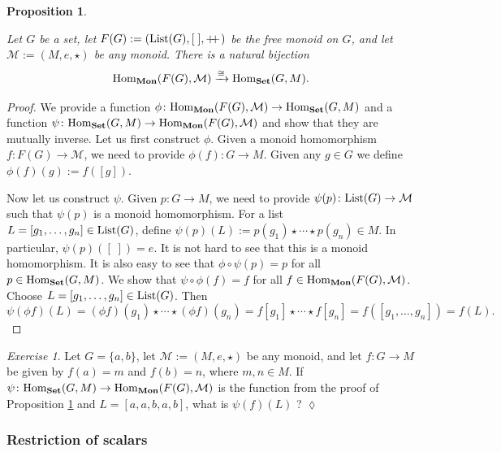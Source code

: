 \documentclass{book}
\def\tn{\textnormal}
\def\mc{\mathcal}
\def\Hom{\tn{Hom}}
\def\List{\tn{List}}
\def\to{\rightarrow}
\def\taking{\colon}
\def\iso{\cong}
\def\plpl{+\!\!+\hspace{1pt}}
\newcommand{\To}[1]{\xrightarrow{#1}}
\def\Mon{{\bf Mon}}
\def\Set{{\bf Set}}
\def\mcM{\mc{M}}
\newtheorem{proposition}[subsubsection]{Proposition}
\theoremstyle{remark}
\newtheorem{exc}[subsubsection]{Exercise}
\newenvironment{exercise}{\begin{exc}}{\hspace*{\fill}$\lozenge$\end{exc}}
\theoremstyle{definition}
\begin{document}
\begin{proposition}\label{prop:free monoid}

Let $G$ be a set, let $F(G):=(\List(G),[\;],\plpl)$ be the free monoid on $G$, and let $\mcM:=(M,e,\star)$ be any monoid. There is a natural bijection
$$\Hom_\Mon(F(G),\mcM)\To{\iso}\Hom_\Set(G,M).$$

\end{proposition}

\begin{proof}

We provide a function $\phi\taking\Hom_\Mon(F(G),\mcM)\to\Hom_\Set(G,M)$ and a function $\psi\taking\Hom_\Set(G,M)\to\Hom_\Mon(F(G),\mcM)$ and show that they are mutually inverse. Let us first construct $\phi$. Given a monoid homomorphism $f\taking F(G)\to\mcM$, we need to provide $\phi(f)\taking G\to M$. Given any $g\in G$ we define $\phi(f)(g):=f([g]).$ 

Now let us construct $\psi$. Given $p\taking G\to M$, we need to provide $\psi(p)\taking\List(G)\to\mcM$ such that $\psi(p)$ is a monoid homomorphism. For a list $L=[g_1,\ldots,g_n]\in\List(G)$, define $\psi(p)(L):=p(g_1)\star\cdots\star p(g_n)\in M$. In particular, $\psi(p)([\;])=e$. It is not hard to see that this is a monoid homomorphism. It is also easy to see that $\phi\circ\psi(p)=p$ for all $p\in\Hom_\Set(G,M)$. We show that $\psi\circ\phi(f)=f$ for all $f\in\Hom_\Mon(F(G),\mcM)$. Choose $L=[g_1,\ldots,g_n]\in\List(G)$. Then 
$$\psi(\phi f)(L)=(\phi f)(g_1)\star\cdots\star(\phi f)(g_n)=f[g_1]\star\cdots\star f[g_n]=f([g_1,\ldots,g_n])=f(L).$$

\end{proof}

\begin{exercise}
Let $G=\{a,b\}$, let $\mcM:=(M,e,\star)$ be any monoid, and let $f\taking G\to M$ be given by $f(a)=m$ and $f(b)=n$, where $m,n\in M$. If $\psi\taking\Hom_\Set(G,M)\to\Hom_\Mon(F(G),\mcM)$ is the function from the proof of Proposition \ref{prop:free monoid} and $L=[a,a,b,a,b]$, what is $\psi(f)(L)$ ?
\end{exercise}


\subsubsection{Restriction of scalars}
\end{document}
